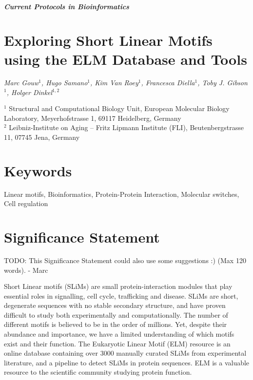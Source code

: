 \documentclass[12pt]{article}
\begin{document}

\thispagestyle{plain}
\begin{center}

\textbf{\LARGE \textit{Current Protocols in Bioinformatics}}\\\vspace{2mm}
\end{center}

\section*{Exploring Short Linear Motifs using the ELM Database and Tools}

{\small \it
Marc Gouw$^{1}$,
Hugo Samano$^{1}$,
Kim Van Roey$^{1}$,
Francesca Diella$^{1}$,
Toby J. Gibson$^{1}$,
Holger Dinkel$^{1,2}$

$^{1}$ Structural and Computational Biology Unit, European Molecular Biology
Laboratory, Meyerhofstrasse 1, 69117 Heidelberg, Germany\\
$^{2}$ Leibniz-Institute on Aging -- Fritz Lipmann Institute (FLI),
Beutenbergstrasse 11, 07745 Jena, Germany
}

\section*{Keywords}

Linear motifs, Bioinformatics, Protein-Protein Interaction, Molecular
switches, Cell regulation

\section*{Significance Statement}

TODO: This Significance Statement could also use some suggestions :) (Max 120
words). - Marc 

Short Linear motifs (SLiMs) are small protein-interaction modules that play
essential roles in signalling, cell cycle, trafficking and disease.
SLiMs are short, degenerate sequences with no stable
secondary structure, and have proven difficult to study both experimentally
and computationally.
The number of different motifs is believed to be in the order of millions.
Yet, despite their abundance and importance, we have a limited
understanding of which motifs exist and their function.
The Eukaryotic Linear Motif (ELM) resource is an online database containing
over 3000 manually curated SLiMs from experimental
literature, and a pipeline to detect SLiMs in protein sequences.
ELM is a valuable resource to the scientific community studying protein
function.
\end{document}
